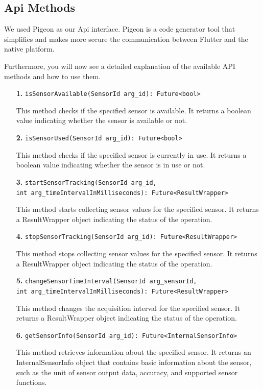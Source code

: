 \documentclass[12pt]{article}
\begin{document}
\subsection{Api Methods}
We used Pigeon as our Api interface. Pigeon is a code generator tool that simplifies and makes more secure the communication between Flutter and the native platform.

Furthermore, you will now see a detailed explanation of the available API methods and how to use them. 
\begin{itemize}
    \item[\textbf{1.}] \texttt{isSensorAvailable(SensorId arg\_id): Future<bool>}
    
    This method checks if the specified sensor is available. It returns a boolean value indicating whether the sensor is available or not.
    
    \item[\textbf{2.}] \texttt{isSensorUsed(SensorId arg\_id): Future<bool>}
    
    This method checks if the specified sensor is currently in use. It returns a boolean value indicating whether the sensor is in use or not.

    \item[\textbf{3.}] \texttt{startSensorTracking(SensorId arg\_id, \\ int arg\_timeIntervalInMilliseconds): Future<ResultWrapper>}
    
    This method starts collecting sensor values for the specified sensor. It returns a ResultWrapper object indicating the status of the operation.

    \item[\textbf{4.}] \texttt{stopSensorTracking(SensorId arg\_id): Future<ResultWrapper>}
    
    This method stops collecting sensor values for the specified sensor. It returns a ResultWrapper object indicating the status of the operation.

    \item[\textbf{5.}] \texttt{changeSensorTimeInterval(SensorId arg\_sensorId, \\ int arg\_timeIntervalInMilliseconds): Future<ResultWrapper>}
    
    This method changes the acquisition interval for the specified sensor. It returns a ResultWrapper object indicating the status of the operation.

    \item[\textbf{6.}] \texttt{getSensorInfo(SensorId arg\_id): Future<InternalSensorInfo>}
    
    This method retrieves information about the specified sensor. It returns an InternalSensorInfo object that contains basic information about the sensor, such as the unit of sensor output data, accuracy, and supported sensor functions.
\end{itemize}
\end{document}
